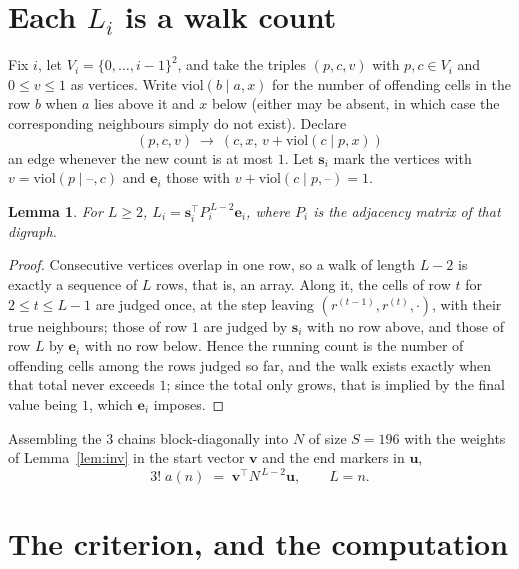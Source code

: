 \documentclass[11pt,a4paper]{article}
\theoremstyle{plain}
\newtheorem{lemma}[theorem]{Lemma}
\theoremstyle{definition}
\begin{document}
\section{Each $L_i$ is a walk count}

Fix $i$, let $V_i=\{0,\dots,i-1\}^{2}$, and take the triples $(p,c,v)$ with
$p,c\in V_i$ and $0\le v\le1$ as vertices. Write $\mathrm{viol}(b\mid a,x)$ for the number
of offending cells in the row $b$ when $a$ lies above it and $x$ below (either may be
absent, in which case the corresponding neighbours simply do not exist). Declare
\[
(p,c,v)\ \longrightarrow\ (c,x,\,v+\mathrm{viol}(c\mid p,x))
\]
an edge whenever the new count is at most $1$. Let $\mathbf{s}_i$ mark the vertices with
$v=\mathrm{viol}(p\mid\text{--},c)$ and $\mathbf{e}_i$ those with
$v+\mathrm{viol}(c\mid p,\text{--})=1$.

\begin{lemma}\label{lem:walk}
For $L\ge2$, $L_i=\mathbf{s}_i^{\!\top}P_i^{\,L-2}\mathbf{e}_i$, where $P_i$ is the
adjacency matrix of that digraph.
\end{lemma}

\begin{proof}
Consecutive vertices overlap in one row, so a walk of length $L-2$ is exactly a sequence
of $L$ rows, that is, an array. Along it, the cells of row $t$ for $2\le t\le L-1$ are
judged once, at the step leaving $(r^{(t-1)},r^{(t)},\cdot)$, with their true neighbours;
those of row $1$ are judged by $\mathbf{s}_i$ with no row above, and those of row
$L$ by $\mathbf{e}_i$ with no row below. Hence the running count is the number of
offending cells among the rows judged so far, and the walk exists exactly when that total
never exceeds $1$; since the total only grows, that is implied by the final value being
$1$, which $\mathbf{e}_i$ imposes.
\end{proof}

Assembling the $3$ chains block-diagonally into $N$ of size $S=196$ with the weights of
Lemma~\ref{lem:inv} in the start vector $\mathbf{v}$ and the end markers in
$\mathbf{u}$,
\begin{equation}\label{eq:walk2}
3!\;a(n)\;=\;\mathbf{v}^{\!\top}N^{\,L-2}\mathbf{u},\qquad L=n .
\end{equation}

\section{The criterion, and the computation}
\end{document}
